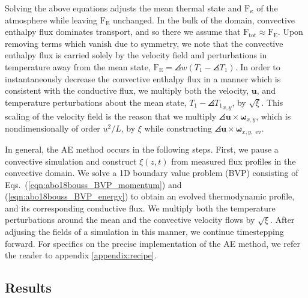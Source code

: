 Solving the above equations adjusts the mean thermal state and $\text{F}_{\kappa}$ of the atmosphere while leaving $\text{F}_{\text{E}}$ unchanged. 
In the bulk of the domain, convective enthalpy flux dominates transport, and so there we assume that $\text{F}_{\text{tot}} \approx \text{F}_{\text{E}}$. 
Upon removing terms which vanish due to symmetry, we note that the convective enthalpy flux is carried solely by the velocity field and perturbations in temperature away from the mean state, $\text{F}_{\text{E}} = \angles{w(T_1 - \angles{T_1})}$.
In order to instantaneously decrease the convective enthalpy flux in a manner which is consistent with the conductive flux, we multiply both the velocity, $\bm{u}$, and temperature perturbations about the mean state, $T_1-\angles{T_1}_{x,y}$,  by $\sqrt{\xi}$. This scaling of the velocity field is the reason that we multiply $\angles{\bm{u}\times\bm{\omega}}_{x, y}$, which is nondimensionally of order $u^2/L$, by $\xi$ while constructing $\angles{\bm{u}\times\bm{\omega}}_{x, y,\text{ ev}}$.

In general, the AE method occurs in the following steps. First, we pause a convective simulation and construct $\xi(z,t)$ from measured flux profiles in the convective domain.
We solve a 1D boundary value problem (BVP) consisting of Eqs.~(\ref{eqn:abo18bouss_BVP_momentum}) and (\ref{eqn:abo18bouss_BVP_energy}) to obtain an evolved thermodynamic profile, and its corresponding conductive flux.
We multiply both the temperature perturbations around the mean and the convective velocity flows by $\sqrt{\xi}$.
After adjusing the fields of a simulation in this manner, we continue timestepping forward.
For specifics on the precise implementation of the AE method, we refer the reader to appendix \ref{appendix:recipe}.

\subsection{Results}
\label{sec:abo18_results}

